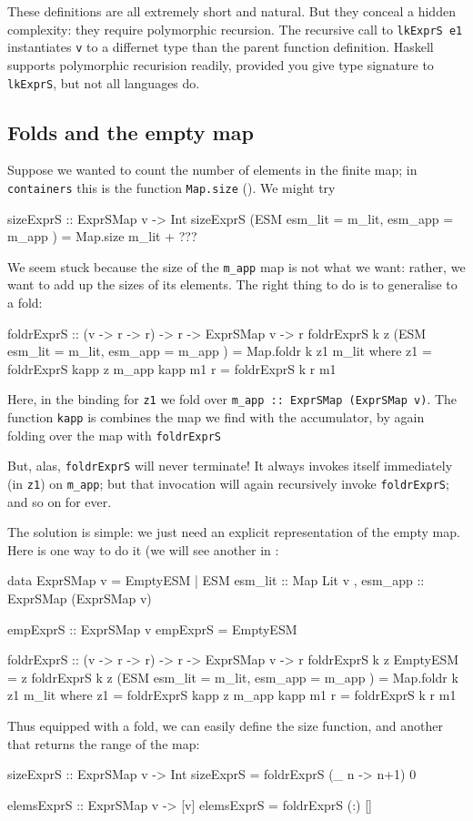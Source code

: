 \documentclass[format=sigplan]{acmart}
\theoremstyle{theorem}
\theoremstyle{definition}
\theoremstyle{remark}
\begin{document}
These definitions are all extremely short and natural. But they conceal a hidden
complexity: they require polymorphic recursion. The recursive call to \lstinline{lkExprS e1}
instantiates \lstinline{v} to a differnet type than the parent function definition.
Haskell supports polymorphic recurision readily, provided you give type signature to
\lstinline{lkExprS}, but not all languages do.

\subsection{Folds and the empty map} \label{sec:fold}

Suppose we wanted to count the number of elements in the finite map; in \lstinline{containers}
this is the function \lstinline{Map.size} ().  We might try
\begin{code}
  sizeExprS :: ExprSMap v -> Int
  sizeExprS (ESM { esm_lit = m_lit, esm_app = m_app })
    = Map.size m_lit + ???
\end{code}
We seem stuck because the size of the \lstinline{m_app} map is not what we want: rather,
we want to add up the sizes of its elements.   The right thing to do is to generalise to a fold:
\begin{code}
  foldrExprS :: (v -> r -> r) -> r -> ExprSMap v -> r
  foldrExprS k z (ESM { esm_lit = m_lit, esm_app = m_app })
    = Map.foldr k z1 m_lit
    where
      z1 = foldrExprS kapp z m_app
      kapp m1 r = foldrExprS k r m1
\end{code}
Here, in the binding for \lstinline{z1} we fold over \lstinline{m_app :: ExprSMap (ExprSMap v)}.
The function \lstinline{kapp} is combines the map we find with the accumulator, by again
folding over the map with \lstinline{foldrExprS}

But, alas, \lstinline{foldrExprS} will never terminate!  It always invokes itself immediately
(in \lstinline{z1}) on \lstinline{m_app}; but that invocation will again recursively invoke
\lstinline{foldrExprS}; and so on for ever.

The solution is simple: we just need an explicit representation of the empty map.
Here is one way to do it (we will see another in :
\begin{code}
  data ExprSMap v = EmptyESM
                  | ESM { esm_lit :: Map Lit v
                        , esm_app :: ExprSMap (ExprSMap v) }

  empExprS :: ExprSMap v
  empExprS = EmptyESM

  foldrExprS :: (v -> r -> r) -> r -> ExprSMap v -> r
  foldrExprS k z EmptyESM
    = z
  foldrExprS k z (ESM { esm_lit = m_lit, esm_app = m_app })
    = Map.foldr k z1 m_lit
    where
      z1 = foldrExprS kapp z m_app
      kapp m1 r = foldrExprS k r m1
\end{code}
Thus equipped with a fold, we can easily define the size function, and another
that returns the range of the map:
\begin{code}
  sizeExprS :: ExprSMap v -> Int
  sizeExprS = foldrExprS (\_ n -> n+1) 0

  elemsExprS :: ExprSMap v -> [v]
  elemsExprS = foldrExprS (:) []
\end{code}
\end{document}
